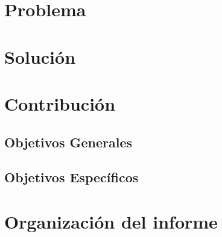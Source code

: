 \section{Problema}

\section{Solución}

\section{Contribución}
\subsection{Objetivos Generales}
\subsection{Objetivos Específicos}

\section{Organización del informe}